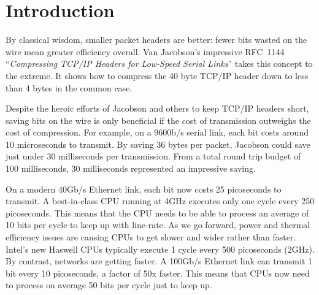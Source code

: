 
\section{Introduction}
\label{s:intro}


By classical wisdom, smaller packet headers are better: fewer bits wasted on the wire mean greater efficiency overall. 
Van Jacobson's impressive RFC~1144~\cite{rfc1144} ``\emph{Compressing TCP/IP Headers for Low-Speed Serial Links}'' takes this concept to the extreme.
It shows how to compress the 40 byte TCP/IP header down to less than 4 bytes in the common case. 


Despite the heroic efforts of Jacobson and others to keep TCP/IP headers short, saving bits on the wire is only beneficial if the cost of transmission outweighs the cost of compression. 
For example, on a 9600b/s serial link, each bit costs around 10 microseconds to transmit. 
By saving 36 bytes per packet, Jacobson could save just under 30 milliseconds per transmission.
From a total round trip budget of 100 milliseconds, 30 milliseconds represented an impressive saving.


On a modern 40Gb/s Ethernet link, each bit now costs 25 picoseconds to transmit.
A best-in-class CPU running at 4GHz executes only one cycle every 250 picoseconds. 
This means that the CPU needs to be able to process an average of 10 bits per cycle to keep up with line-rate. 
As we go forward, power and thermal efficiency issues are causing CPUs to get slower and wider rather than faster. 
Intel's new Haswell CPUs typically execute 1 cycle every 500 picoseconds (2GHz). 
By contrast, networks are getting faster. A 100Gb/s Ethernet link can transmit 1 bit every 10 picoseconds, a factor of 50x faster. 
This means that CPUs now need to process on average 50 bits per cycle just to keep up. 


